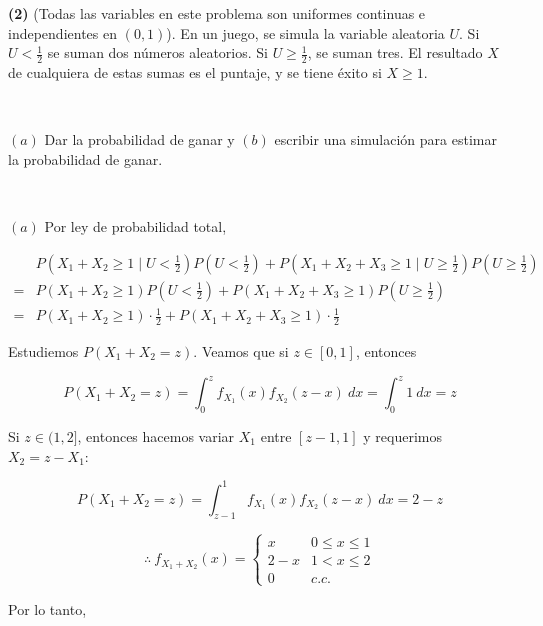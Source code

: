 \documentclass[a4paper, 12pt]{article}
\begin{document}
\begin{myframe}
\textbf{(2)} (Todas las variables en este problema son uniformes continuas e
independientes en
$(0, 1)$).
En un juego, se simula la variable aleatoria $U$.
Si $U < \frac{1}{2}$ se suman dos números aleatorios. Si $U \geq
\frac{1}{2}$, se suman tres. El resultado $X$ de cualquiera de estas sumas
es el puntaje, y se tiene éxito si $X \geq 1$.

~

$(a)$ Dar la probabilidad de ganar y $(b)$ escribir una simulación para estimar
la probabilidad de ganar.
\end{myframe}

~

$(a)$ Por ley de probabilidad total,

\begin{align*}
  &P(X_1 + X_2 \geq 1 \mid U < \frac{1}{2})P(U < \frac{1}{2}) + P(X_1 +
  X_2 + X_3 \geq 1\mid
  U \geq \frac{1}{2})P(U \geq \frac{1}{2}) \\ 
  =&P(X_1 + X_2 \geq 1)P(U < \frac{1}{2}) + P(X_1 + X_2 + X_3 \geq 1)P(U \geq
  \frac{1}{2})\\
  =&P(X_1 + X_2 \geq 1)\cdot \frac{1}{2} + P(X_1 + X_2 + X_3 \geq
  1)\cdot \frac{1}{2}
\end{align*}

Estudiemos $P(X_1 + X_2 = z)$. Veamos que si $z \in [0, 1]$, entonces

\begin{equation*}
  P(X_1 + X_2 = z) = \int_0^z f_{X_1}(x)f_{X_2}(z-x) ~ dx = \int_0^z 1 ~ dx 
  =z
\end{equation*}

Si $z \in (1, 2]$, entonces hacemos variar $X_1$ entre $[z-1, 1]$ y requerimos
$X_2 = z - X_1$:

\begin{equation*}
  P(X_1 + X_2 = z) 
  = \int_{z-1}^{1} f_{X_1}(x) f_{X_2}(z - x) ~  dx = 2 -z
\end{equation*}



\begin{equation*}
  \therefore ~ f_{X_1 + X_2}(x) = \begin{cases}
    x & 0 \leq x \leq 1 \\ 
    2 - x & 1 < x \leq 2 \\ 
    0 & c.c.
  \end{cases}
\end{equation*}

Por lo tanto,
\end{document}
